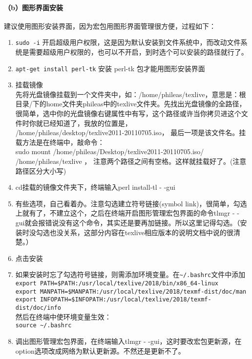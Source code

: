 \paragraph{（b）图形界面安装}
建议使用图形安装界面，因为宏包用图形界面管理很方便，过程如下：
\begin{enumerate}
\item \verb*|sudo -i| 开启超级用户权限，这是因为默认安装到文件系统中，而改动文件系统是需要超级用户权限的，也可以不开启，到时选个可以安装的路径就行了。
\item  \verb*|apt-get install perl-tk| 安装 perl-tk 包才能用图形安装界面
\item 挂载镜像\\
先将光盘镜像挂载到一个文件夹中，如：/home/phileas/texlive，意思是：根目录/下的home文件夹phileas中的texlive文件夹。先找出光盘镜像的全路径，很简单，选中你的光盘镜像右键属性中有写，这个路径或许当你拷贝进这个文件时你就已经知道了，我放的位置是，\\
/home/phileas/desktop/texlive2011-20110705.iso，
最后一项是该文件名。挂载方法是在终端中，敲命令：\\
sudo mount /home/phileas/Desktop/texlive2011-20110705.iso/~~ /home/phileas/texlive ，
注意两个路径之间有空格。这样就挂载好了。(注意路径区分大小写)
\item cd挂载的镜像文件夹下，终端输入perl install-tl  - -gui
\item 有些选项，自己看着办。注意勾选建立符号链接(symbol link)，很简单，勾选上就有了，不建立这个，之后在终端开启图形管理宏包界面的命令tlmgr - - gui就会报错说没有这个命令，其实还是要再加链接。所以这里记得勾选。（安装时没勾选也没关系，这部分内容在texlive相应版本的说明文档中说的很清楚。）
\item 点击安装

\item 如果安装时忘了勾选符号链接，则需添加环境变量。在\verb|~/.bashrc|文件中添加\\
\verb|export PATH=$PATH:/usr/local/texlive/2018/bin/x86_64-linux|\\
\verb|export MANPATH=$MANPATH:/usr/local/texlive/2018/texmf-dist/doc/man|\\
\verb|export INFOPATH=$INFOPATH:/usr/local/texlive/2018/texmf-dist/doc/info|\\
然后在终端中使环境变量生效：\\
\verb|source ~/.bashrc|

\item 调出图形管理宏包界面，在终端输入tlmgr - -gui，这时要改宏包更新源，在option选项改成网络为默认更新源。不然还是更新不了。
\end{enumerate}




